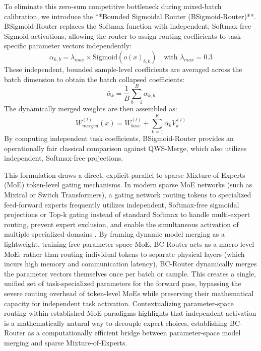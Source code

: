 To eliminate this zero-sum competitive bottleneck during mixed-batch calibration, we introduce the **Bounded Sigmoidal Router (BSigmoid-Router)**. BSigmoid-Router replaces the Softmax function with independent, Softmax-free Sigmoid activations, allowing the router to assign routing coefficients to task-specific parameter vectors independently:
\begin{equation}
    \alpha_{k, b} = \lambda_{max} \times \text{Sigmoid}(o(x)_{b, k}) \quad \text{with } \lambda_{max} = 0.3
\end{equation}
These independent, bounded sample-level coefficients are averaged across the batch dimension to obtain the batch collapsed coefficients:
\begin{equation}
    \bar{\alpha}_k = \frac{1}{B} \sum_{b=1}^B \alpha_{k, b}
\end{equation}
The dynamically merged weights are then assembled as:
\begin{equation}
    W_{merged}^{(l)}(x) = W_{base}^{(l)} + \sum_{k=1}^K \bar{\alpha}_k V_k^{(l)}
\end{equation}
By computing independent task coefficients, BSigmoid-Router provides an operationally fair classical comparison against QWS-Merge, which also utilizes independent, Softmax-free projections. 

This formulation draws a direct, explicit parallel to sparse Mixture-of-Experts (MoE) token-level gating mechanisms. In modern sparse MoE networks (such as Mixtral or Switch Transformers), a gating network routing tokens to specialized feed-forward experts frequently utilizes independent, Softmax-free sigmoidal projections or Top-k gating instead of standard Softmax to handle multi-expert routing, prevent expert exclusion, and enable the simultaneous activation of multiple specialized domains \cite{moe, switch_transformers}. 
By framing dynamic model merging as a lightweight, training-free parameter-space MoE, BC-Router acts as a macro-level MoE: rather than routing individual tokens to separate physical layers (which incurs high memory and communication latency), BC-Router dynamically merges the parameter vectors themselves once per batch or sample. 
This creates a single, unified set of task-specialized parameters for the forward pass, bypassing the severe routing overhead of token-level MoEs while preserving their mathematical capacity for independent task activation. 
Contextualizing parameter-space routing within established MoE paradigms highlights that independent activation is a mathematically natural way to decouple expert choices, establishing BC-Router as a computationally efficient bridge between parameter-space model merging and sparse Mixture-of-Experts.

